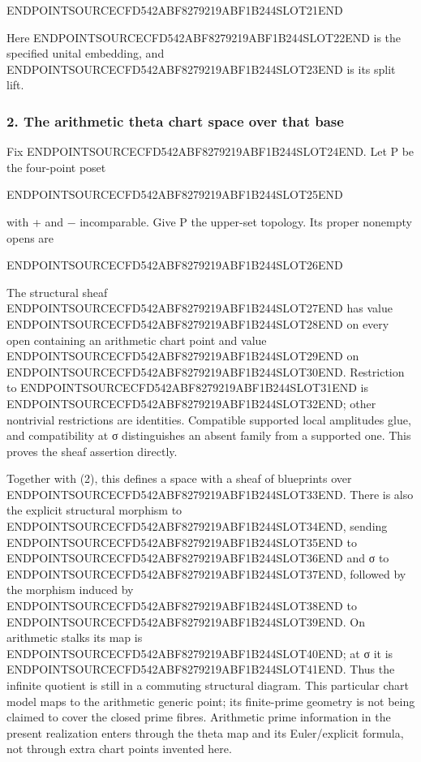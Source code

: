 ENDPOINTSOURCECFD542ABF8279219ABF1B244SLOT21END

Here ENDPOINTSOURCECFD542ABF8279219ABF1B244SLOT22END is the specified unital embedding, and ENDPOINTSOURCECFD542ABF8279219ABF1B244SLOT23END is its split lift.

\subsubsection{2. The arithmetic theta chart space over that base}\label{endpoint-tau_base--the-arithmetic-theta-chart-space-over-that-base}

Fix ENDPOINTSOURCECFD542ABF8279219ABF1B244SLOT24END. Let P be the four-point poset

ENDPOINTSOURCECFD542ABF8279219ABF1B244SLOT25END

with + and − incomparable. Give P the upper-set topology. Its proper nonempty opens are

ENDPOINTSOURCECFD542ABF8279219ABF1B244SLOT26END

The structural sheaf ENDPOINTSOURCECFD542ABF8279219ABF1B244SLOT27END has value ENDPOINTSOURCECFD542ABF8279219ABF1B244SLOT28END on every open containing an arithmetic chart point and value ENDPOINTSOURCECFD542ABF8279219ABF1B244SLOT29END on ENDPOINTSOURCECFD542ABF8279219ABF1B244SLOT30END. Restriction to ENDPOINTSOURCECFD542ABF8279219ABF1B244SLOT31END is ENDPOINTSOURCECFD542ABF8279219ABF1B244SLOT32END; other nontrivial restrictions are identities. Compatible supported local amplitudes glue, and compatibility at σ distinguishes an absent family from a supported one. This proves the sheaf assertion directly.

Together with (2), this defines a space with a sheaf of blueprints over ENDPOINTSOURCECFD542ABF8279219ABF1B244SLOT33END. There is also the explicit structural morphism to ENDPOINTSOURCECFD542ABF8279219ABF1B244SLOT34END, sending ENDPOINTSOURCECFD542ABF8279219ABF1B244SLOT35END to ENDPOINTSOURCECFD542ABF8279219ABF1B244SLOT36END and σ to ENDPOINTSOURCECFD542ABF8279219ABF1B244SLOT37END, followed by the morphism induced by ENDPOINTSOURCECFD542ABF8279219ABF1B244SLOT38END to ENDPOINTSOURCECFD542ABF8279219ABF1B244SLOT39END. On arithmetic stalks its map is ENDPOINTSOURCECFD542ABF8279219ABF1B244SLOT40END; at σ it is ENDPOINTSOURCECFD542ABF8279219ABF1B244SLOT41END. Thus the infinite quotient is still in a commuting structural diagram. This particular chart model maps to the arithmetic generic point; its finite-prime geometry is not being claimed to cover the closed prime fibres. Arithmetic prime information in the present realization enters through the theta map and its Euler/explicit formula, not through extra chart points invented here.

